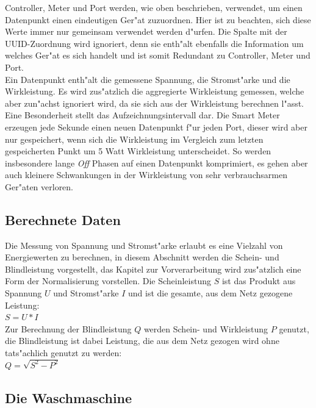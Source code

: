 Controller, Meter und Port werden, wie oben beschrieben, verwendet, um einen Datenpunkt einen eindeutigen Ger"at zuzuordnen. Hier ist zu beachten, sich diese Werte immer nur gemeinsam verwendet werden d"urfen.
Die Spalte mit der UUID-Zuordnung wird ignoriert, denn sie enth"alt ebenfalls die Information um welches Ger"at es sich handelt und ist somit Redundant zu Controller, Meter und Port. \\
Ein Datenpunkt enth"alt die gemessene Spannung, die Stromst"arke und die Wirkleistung. Es wird zus"atzlich die aggregierte Wirkleistung gemessen, welche aber zun"achst ignoriert wird, da sie sich aus der Wirkleistung berechnen l"asst. \\
Eine Besonderheit stellt das Aufzeichnungsintervall dar. Die Smart Meter erzeugen jede Sekunde einen neuen Datenpunkt f"ur jeden Port, dieser wird aber nur gespeichert, wenn sich die Wirkleistung im Vergleich zum letzten gespeicherten Punkt um 5 Watt Wirkleistung unterscheidet. So werden insbesondere lange \textit{Off} Phasen auf einen Datenpunkt komprimiert, es gehen aber auch kleinere Schwankungen in der Wirkleistung von sehr verbrauchsarmen Ger"aten verloren.


\subsection{Berechnete Daten}
\label{Berechnete Daten}

Die Messung von Spannung und Stromst"arke erlaubt es eine Vielzahl von Energiewerten zu berechnen, in diesem Abschnitt werden die Schein- und Blindleistung vorgestellt, das Kapitel zur Vorverarbeitung wird zus"atzlich eine Form der Normalisierung vorstellen. 
Die Scheinleistung $S$ ist das Produkt aus Spannung $U$ und Stromst"arke $I$ und ist die gesamte, aus dem Netz gezogene Leistung:\\ $S = U * I$\\[0.5cm]
Zur Berechnung der Blindleistung $Q$ werden Schein- und Wirkleistung $P$ genutzt, die Blindleistung ist dabei Leistung, die aus dem Netz gezogen wird ohne tats"achlich genutzt zu werden:\\ $Q = \sqrt{S^2 - P^2}$ \\


\subsection{Die Waschmaschine}
\label{Die Waschmaschine}

